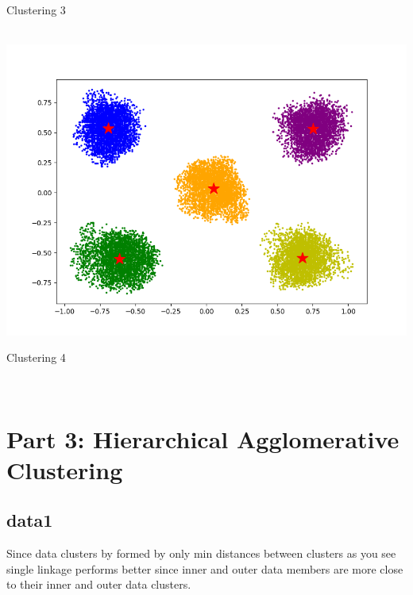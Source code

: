 \documentclass{article}
\begin{document}
\centerline{Clustering 3}\\
\includegraphics[width=\linewidth]{clustering_images/clustering4kmeans.png}
\centerline{Clustering 4}\\

\maketitle
\section{Part 3: Hierarchical Agglomerative Clustering}
\subsection{data1}

Since data clusters by formed by only min distances between clusters as you see single linkage performs better since inner and outer data members are more close to their inner and outer data clusters.\\
\end{document}
